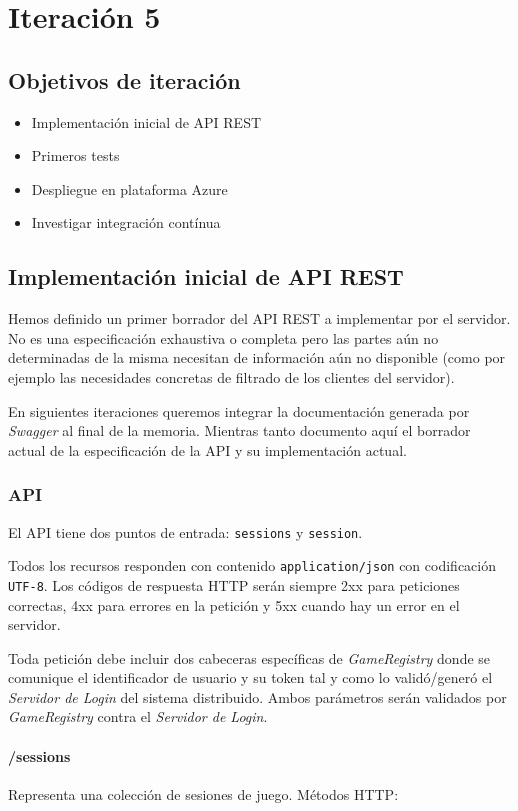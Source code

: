 \chapter{Iteración 5}
\section{Objetivos de iteración}
\begin{itemize}
  \item Implementación inicial de API REST
  \item Primeros tests
  \item Despliegue en plataforma Azure
  \item Investigar integración contínua
\end{itemize}


\section{Implementación inicial de API REST}
Hemos definido un primer borrador del API REST a implementar por el servidor. No
es una especificación exhaustiva o completa pero las partes aún no determinadas
de la misma necesitan de información aún no disponible (como por ejemplo las 
necesidades concretas de filtrado de los clientes del servidor).

En siguientes iteraciones queremos integrar la documentación generada por
\emph{Swagger} al final de la memoria. Mientras tanto documento aquí el
borrador actual de la especificación de la API y su implementación actual.

\subsection{API}
El API tiene dos puntos de entrada: \texttt{sessions} y \texttt{session}. 

Todos los recursos responden con contenido \texttt{application/json} con
codificación \texttt{UTF-8}. Los códigos de respuesta HTTP serán siempre
2xx para peticiones correctas, 4xx para errores en la petición y 5xx cuando
hay un error en el servidor.

Toda petición debe incluir dos cabeceras específicas de \emph{GameRegistry}
donde se comunique el identificador de usuario y su token tal y como lo 
validó/generó el \emph{Servidor de Login} del sistema distribuido. Ambos
parámetros serán validados por \emph{GameRegistry} contra el 
\emph{Servidor de Login}.

\subsubsection{/sessions}
Representa una colección de sesiones de juego. Métodos HTTP:

